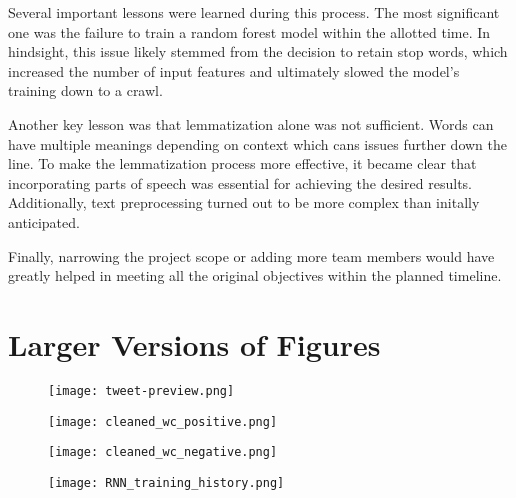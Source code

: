 \documentclass{article}
\begin{document}
\begin{multicols}{2}
Several important lessons were learned during this process. The most significant one was the failure to train a random forest model within the allotted time. In hindsight, this issue likely stemmed from the decision to retain stop words, which increased the number of input features and ultimately slowed the model's training down to a crawl.

Another key lesson was that lemmatization alone was not sufficient. Words can have multiple meanings depending on context which cans issues further down the line. To make the lemmatization process more effective, it became clear that incorporating parts of speech was essential for achieving the desired results. Additionally, text preprocessing turned out to be more complex than initally anticipated.

Finally, narrowing the project scope or adding more team members would have greatly helped in meeting all the original objectives within the planned timeline.




\end{multicols}

\pagebreak

\appendix
\section{Larger Versions of Figures}

\begin{figure}[H]
\centering
\texttt{[image: tweet-preview.png]}
\end{figure}

\begin{figure}[H]
\centering
\texttt{[image: cleaned\_wc\_positive.png]}
\end{figure}

\begin{figure}[H]
\centering
\texttt{[image: cleaned\_wc\_negative.png]}
\end{figure}

\begin{figure}[H]
\centering
\texttt{[image: RNN\_training\_history.png]}
\label{fig:rnn_training}
\end{figure}
\end{document}
